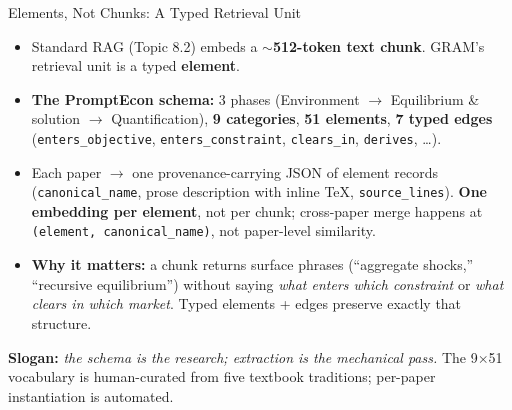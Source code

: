\begin{frame}{Elements, Not Chunks: A Typed Retrieval Unit}
\begin{itemize}
\item Standard RAG (Topic 8.2) embeds a \textbf{$\sim$512-token text chunk}. GRAM's retrieval unit is a typed \textbf{element}.

\medskip
\item \textbf{The PromptEcon schema:} 3 phases (Environment $\to$ Equilibrium \& solution $\to$ Quantification), \textbf{9 categories}, \textbf{51 elements}, \textbf{7 typed edges} (\texttt{enters\_objective}, \texttt{enters\_constraint}, \texttt{clears\_in}, \texttt{derives}, \ldots).

\item Each paper $\to$ one provenance-carrying JSON of element records (\texttt{canonical\_name}, prose description with inline \TeX{}, \texttt{source\_lines}). \textbf{One embedding per element}, not per chunk; cross-paper merge happens at \texttt{(element, canonical\_name)}, not paper-level similarity.

\medskip
\item \textbf{Why it matters:} a chunk returns surface phrases (``aggregate shocks,'' ``recursive equilibrium'') without saying \emph{what enters which constraint} or \emph{what clears in which market}. Typed elements + edges preserve exactly that structure.
\end{itemize}
\begin{takeawaybox}
\textbf{Slogan:} \emph{the schema is the research; extraction is the mechanical pass.} The 9$\times$51 vocabulary is human-curated from five textbook traditions; per-paper instantiation is automated.
\end{takeawaybox}
\end{frame}


